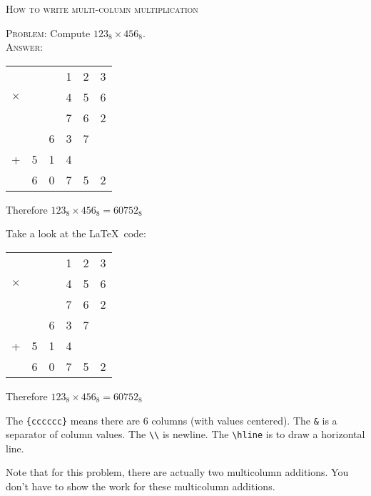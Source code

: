 \textsc{How to write multi-column multiplication}

\textsc{Problem:} Compute $123_{8} \times 456_{8}$.
\\
\textsc{Answer:}\vspace{-2mm}
\begin{answerlong}
\begin{longtable}{cccccc}
         &   &   & 1 & 2 & 3 \\
$\times$ &   &   & 4 & 5 & 6 \\ \hline
         &   &   & 7 & 6 & 2 \\
         &   & 6 & 3 & 7 &   \\ 
  +      & 5 & 1 & 4 &   &   \\ \hline
         & 6 & 0 & 7 & 5 & 2 \\ \hline
\end{longtable}
Therefore $123_{8} \times 456_{8} = 60752_{8}$
\end{answerlong}

Take a look at the \LaTeX\ code:
\begin{console}[fontsize=\footnotesize]
\begin{longtable}{cccccc}
         &   &   & 1 & 2 & 3 \\
$\times$ &   &   & 4 & 5 & 6 \\ \hline
         &   &   & 7 & 6 & 2 \\
         &   & 6 & 3 & 7 &   \\ 
  +      & 5 & 1 & 4 &   &   \\ \hline
         & 6 & 0 & 7 & 5 & 2 \\ \hline
\end{longtable}
Therefore $123_{8} \times 456_{8} = 60752_{8}$
\end{console}
The \verb!{cccccc}! means there are 6 columns (with values centered).
The \verb!&! is a separator of column values.
The \verb!\\! is newline.
The \verb!\hline! is to draw a horizontal line.

Note that for this problem,
there are actually two multicolumn additions.
You don't have to show the work for these multicolumn additions.
